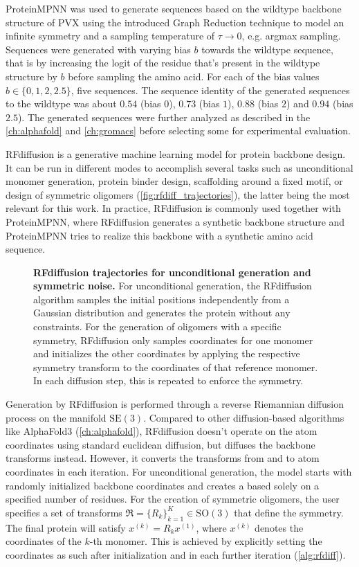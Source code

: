 ProteinMPNN was used to generate sequences based on the wildtype backbone structure of PVX using the introduced Graph Reduction technique to model an infinite symmetry and a sampling temperature of $\tau\rightarrow 0$, e.g. argmax sampling. Sequences were generated with varying bias $b$ towards the wildtype sequence, that is by increasing the logit of the residue that's present in the wildtype structure by $b$ before sampling the amino acid. For each of the bias values $b \in \{0, 1, 2, 2.5\}$, five sequences. The sequence identity of the generated sequences to the wildtype was about $0.54$ (bias $0$), $0.73$ (bias $1$), $0.88$ (bias $2$) and $0.94$ (bias $2.5$). The generated sequences were further analyzed as described in the \autoref{ch:alphafold} and \autoref{ch:gromacs} before selecting some for experimental evaluation. 

RFdiffusion is a generative machine learning model for protein backbone design. It can be run in different modes to accomplish several tasks such as unconditional monomer generation, protein binder design, scaffolding around a fixed motif, or design of symmetric oligomers (\autoref{fig:rfdiff_trajectories}), the latter being the most relevant for this work. In practice, RFdiffusion is commonly used together with ProteinMPNN, where RFdiffusion generates a synthetic backbone structure and ProteinMPNN tries to realize this backbone with a synthetic amino acid sequence. 

\begin{figure}
\centering

\caption{\textbf{RFdiffusion trajectories for unconditional generation and symmetric noise.} For unconditional generation, the RFdiffusion algorithm samples the initial positions independently from a Gaussian distribution and generates the protein without any constraints. For the generation of oligomers with a specific symmetry, RFdiffusion only samples coordinates for one monomer and initializes the other coordinates by applying the respective symmetry transform to the coordinates of that reference monomer. In each diffusion step, this is repeated to enforce the symmetry. }
\label{fig:rfdiff_trajectories}
\end{figure}

Generation by RFdiffusion is performed through a reverse Riemannian diffusion process on the manifold $\mathrm{SE}(3)$. Compared to other diffusion-based algorithms like AlphaFold3 (\autoref{ch:alphafold}), RFdiffusion doesn't operate on the atom coordinates using standard euclidean diffusion, but diffuses the backbone transforms instead. However, it converts the transforms from and to atom coordinates in each iteration. For unconditional generation, the model starts with randomly initialized backbone coordinates and creates a based solely on a specified number of residues. For the creation of symmetric oligomers, the user specifies a set of transforms $\mathfrak{R}=\{R_k\}_{k=1}^K \in \mathrm{SO}(3)$ that define the symmetry. The final protein will satisfy $x^{(k)} = R_k x^{(1)}$, where $x^{(k)}$ denotes the coordinates of the $k$-th monomer. This is achieved by explicitly setting the coordinates as such after initialization and in each further iteration (\autoref{alg:rfdiff}). 

